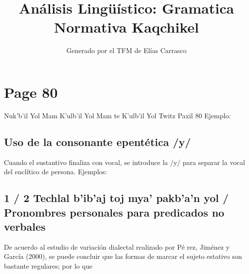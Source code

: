 \documentclass{article}%
\title{Análisis Lingüístico: Gramatica Normativa Kaqchikel}%
\author{Generado por el TFM de Elías Carrasco}%
\begin{document}
%
\normalsize%
\maketitle%
\section{Page 80}%
\label{sec:Page80}%
Nuk’b’il Yol Mam %
K’ulb’il Yol Mam te K’ulb’il Yol Twitz Paxil 80 %
Ejemplo: %
\subsection{Uso de la consonante epentética /y/}%
\label{subsec:Usodelaconsonanteepenttica/y/}%

%
Cuando el sustantivo finaliza con vocal, se introduce la /y/ para %
separar la vocal del enclítico de persona. %
Ejemplos: %
\subsection{1 / 2 Techlal b’ib’aj toj mya’ pakb’a’n yol / Pronombres personales para predicados no verbales}%
\label{subsec:1/2Techlalbibajtojmyapakbanyol/Pronombrespersonalesparapredicadosnoverbales}%

%
De acuerdo al estudio de variación dialectal realizado por Pé %
rez, Jiménez y García (2000), se puede concluir que las formas %
de marcar el sujeto estativo son bastante regulares; por lo que 

%
\end{document}

